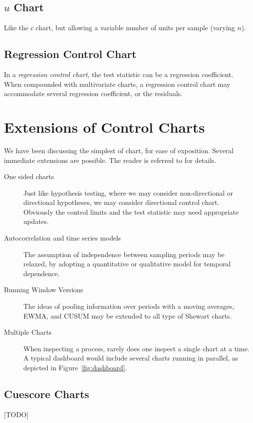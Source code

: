 \subsection{$u$ Chart}
Like the $c$ chart, but allowing a variable number of units per sample (varying $n$).
\subsection{Regression Control Chart}
In a \emph{regression control chart}, the test statistic can be a regression coefficient. 
When compounded with multivariate charts, a regression control chart may accommodate several regression  coefficient, or the residuals. 




\section[Extensions]{Extensions of Control Charts}
We have been discussing the simplest of \barxChart chart, for ease of exposition.
Several immediate extensions are possible.
The reader is referred to \cite{montgomery_introduction_2007} for details.
\begin{description}

\item [One sided charts] Just like hypothesis testing, where we may consider non-directional or directional hypotheses, we may consider directional control chart. 
Obviously the control limits and the test statistic may need appropriate updates.

\item [Autocorrelation and time series models] The assumption of independence between sampling periods may be relaxed, by adopting a quantitative or qualitative model for temporal dependence.

\item [Running Window Versions] The ideas of pooling information over periods with a moving averages, EWMA, and CUSUM may be extended to all type of Shewart charts. 

\item [Multiple Charts] When inspecting a process, rarely does one inspect a single chart at a time. A typical dashboard would include several charts running in parallel, as depicted in Figure~\ref{fig:dashboard}.

\end{description}



\subsection{Cuescore Charts}
[TODO]



